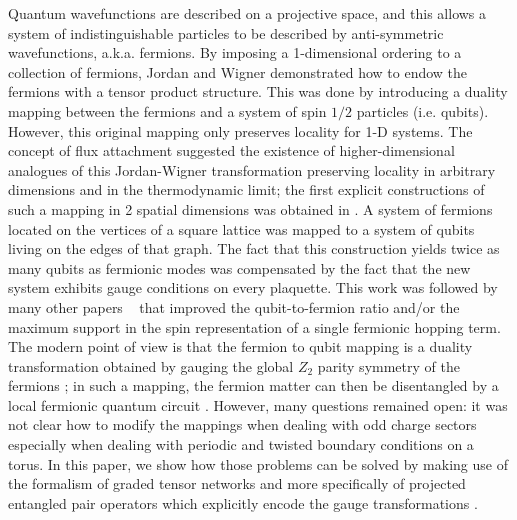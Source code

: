\documentclass[aps,prl,twocolumn,floatfix,10pt,amssymb,amsfont,amsmath,superscriptaddress,float,nofootinbib,longbibliography,nobalancelastpage]{revtex4-2}
\begin{document}
Quantum wavefunctions are described on a projective space, and this allows a system of indistinguishable particles to be described by anti-symmetric wavefunctions, a.k.a. fermions. By imposing a 1-dimensional ordering to a collection of fermions,  Jordan and Wigner \cite{jordan1993paulische} demonstrated how to endow the fermions with a tensor product structure. This was done by introducing a duality mapping between the fermions and a system of spin $1/2$ particles (i.e. qubits). However, this original mapping only preserves locality for 1-D systems. The concept of flux attachment \cite{Jain,Lopez,Halperin,PhysRevLett.71.3622,PhysRevLett.63.322} suggested the existence of higher-dimensional analogues of this Jordan-Wigner transformation preserving locality in arbitrary dimensions and in the thermodynamic limit;  the first explicit constructions of such a mapping in 2 spatial dimensions was obtained in \cite{bravyi_fermionic_2002,Verstraete_2005,Ball_gauge}. A system of fermions located on the vertices of a square lattice was mapped to a system of qubits living on the edges of that graph. The fact that this construction yields twice as many qubits as fermionic modes was compensated by the fact that the new system exhibits gauge conditions on every plaquette. This work was followed by many other papers ~\cite{seeley_bravyi-kitaev_2012,Tranter:2015nri,hastings2015, Whitfield:2016lhw,Havl_ek_2017,Setia_2019, steudtner_quantum_2019,jiang2019,Backens_2019,Jiang_2020, Derby_2021, Chiew_2023,Miller_2023,chen_equivalence_2023, PhysRevB.109.115149} that improved the qubit-to-fermion ratio and/or the maximum support in the spin representation of a single fermionic hopping term. The modern point of view is that the fermion to qubit mapping is a duality transformation obtained by gauging the global $Z_2$ parity symmetry of the fermions \cite{Chen_2018}; in such a mapping, the fermion matter can then be disentangled by a local fermionic quantum circuit \cite{Zohar_2018}. However, many questions remained open: it was not clear how to modify the mappings when dealing with odd charge sectors especially when dealing with periodic and twisted boundary conditions on a torus. In this paper, we show how those problems can be solved by making use of the formalism of graded tensor networks \cite{Bultinck_2017,Cirac_2021} and more specifically of projected entangled pair operators which explicitly encode the  gauge transformations \cite{Haegeman_2015,Shukla_2020}.
\end{document}

